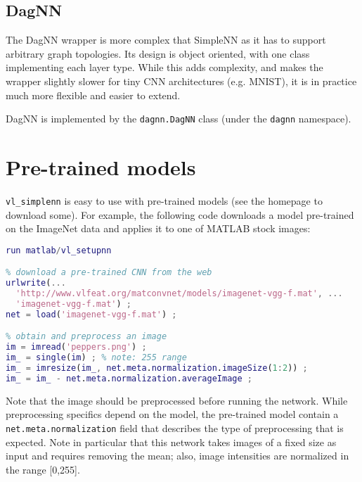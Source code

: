 \subsection{DagNN}\label{s:dagnn}

The DagNN wrapper is more complex that SimpleNN as it has to support arbitrary graph topologies. Its design is object oriented, with one class implementing each layer type. While this adds complexity, and makes the wrapper slightly slower for tiny CNN architectures (e.g. MNIST), it is in practice much more flexible and easier to extend.

DagNN is implemented by the \verb!dagnn.DagNN! class (under the \verb!dagnn! namespace).

\section{Pre-trained models}\label{s:pretrained}

\verb!vl_simplenn! is easy to use with pre-trained models (see the homepage to download some). For example, the following code downloads a model pre-trained on the ImageNet data and applies it to one of MATLAB stock images:
\begin{lstlisting}[language=Matlab]
% setup MatConvNet in MATLAB
run matlab/vl_setupnn

% download a pre-trained CNN from the web
urlwrite(...
  'http://www.vlfeat.org/matconvnet/models/imagenet-vgg-f.mat', ...
  'imagenet-vgg-f.mat') ;
net = load('imagenet-vgg-f.mat') ;

% obtain and preprocess an image
im = imread('peppers.png') ;
im_ = single(im) ; % note: 255 range
im_ = imresize(im_, net.meta.normalization.imageSize(1:2)) ;
im_ = im_ - net.meta.normalization.averageImage ;
\end{lstlisting}
Note that the image should be preprocessed before running the network. While preprocessing specifics depend on the model, the pre-trained model contain a \verb!net.meta.normalization! field that describes the type of preprocessing that is expected. Note in particular that this network takes images of a fixed size as input and requires removing the mean; also, image intensities are normalized in the range [0,255].

